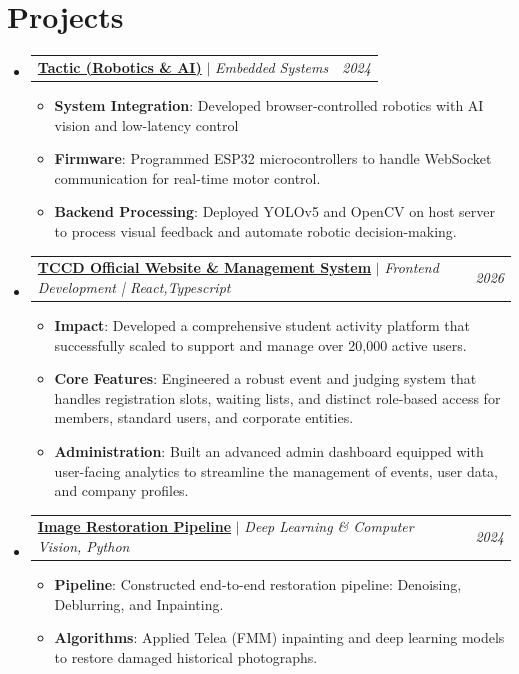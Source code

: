 \documentclass[letterpaper,11pt]{article}
\makeatletter
\newcommand{\resumeItem}[2]{\item\small{\textbf{#1}{: #2 \vspace{-2pt}}}}
\newcommand{\resumeProjectSubheading}[3]{
  \vspace{-1pt}\item
    \begin{tabular*}{0.97\textwidth}{l@{\extracolsep{\fill}}r}
      \textbf{#1} $|$ \textit{\small#2} & #3 \\
    \end{tabular*}\vspace{-5pt}
}
\newcommand{\resumeSubHeadingListStart}{\begin{itemize}[leftmargin=*]}
\newcommand{\resumeSubHeadingListEnd}{\end{itemize}}
\newcommand{\resumeItemListStart}{\vspace*{0.8pt}\begin{itemize}[leftmargin=*,topsep=0pt,itemsep=0.9pt,parsep=0pt,partopsep=0pt]}
\newcommand{\resumeItemListEnd}{\end{itemize}\vspace{-6pt}}
\makeatother
\begin{document}
\section{Projects}
  \resumeSubHeadingListStart
    \resumeProjectSubheading
      {\href{https://github.com/roboSobia}{\textbf{Tactic (Robotics \& AI)}}}{Embedded Systems}{\textit{\small 2024}}
      \resumeItemListStart
        \resumeItem{System Integration}
          {Developed browser-controlled robotics with AI vision and low-latency control}
        \resumeItem{Firmware}
          {Programmed ESP32 microcontrollers to handle WebSocket communication for real-time motor control.}
        \resumeItem{Backend Processing}
          {Deployed YOLOv5 and OpenCV on host server to process visual feedback and automate robotic decision-making.}
      \resumeItemListEnd
    \vspace{4pt}
    \resumeProjectSubheading
      {\href{https://tccd.eng.cu.edu.eg/}{\textbf{TCCD Official Website \& Management System}}}{Frontend Development | React,Typescript}{\textit{\small 2026}}
      \resumeItemListStart
        \resumeItem{Impact}
          {Developed a comprehensive student activity platform that successfully scaled to support and manage over 20,000 active users.}
        \resumeItem{Core Features}
          {Engineered a robust event and judging system that handles registration slots, waiting lists, and distinct role-based access for members, standard users, and corporate entities.}
        \resumeItem{Administration}
          {Built an advanced admin dashboard equipped with user-facing analytics to streamline the management of events, user data, and company profiles.}
      \resumeItemListEnd
    \vspace{4pt}
    \resumeProjectSubheading
      {\href{https://github.com/ahmedfathy0-0/Image-Colorization-of-Historical-Photos}{\textbf{Image Restoration Pipeline}}}{Deep Learning \& Computer Vision, Python}{\textit{\small 2024}}
      \resumeItemListStart
        \resumeItem{Pipeline}
          {Constructed end-to-end restoration pipeline: Denoising, Deblurring, and Inpainting.}
        \resumeItem{Algorithms}
          {Applied Telea (FMM) inpainting and deep learning models to restore damaged historical photographs.}
      \resumeItemListEnd
  \resumeSubHeadingListEnd
  \vspace{-2pt}
\end{document}

